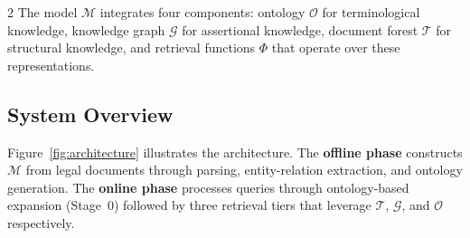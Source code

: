 \documentclass[11pt,a4paper]{article}
\begin{document}
\begin{multicols}{2}
The model $\mathcal{M}$ integrates four components: ontology $\mathcal{O}$ for terminological knowledge, knowledge graph $\mathcal{G}$ for assertional knowledge, document forest $\mathcal{T}$ for structural knowledge, and retrieval functions $\Phi$ that operate over these representations.

\subsection{System Overview}

Figure~\ref{fig:architecture} illustrates the architecture. The \textbf{offline phase} constructs $\mathcal{M}$ from legal documents through parsing, entity-relation extraction, and ontology generation. The \textbf{online phase} processes queries through ontology-based expansion (Stage~0) followed by three retrieval tiers that leverage $\mathcal{T}$, $\mathcal{G}$, and $\mathcal{O}$ respectively.

\end{multicols}
\end{document}
